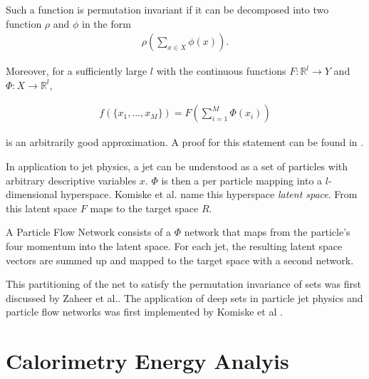 \documentclass[12pt, a4paper]{thesis}
\begin{document}
Such a function is permutation invariant if it can be decomposed into
two function $\rho$ and $\phi$ in the form
\begin{align}
\rho \left(\sum_{x\in X} \phi(x)\right).  
\end{align}

Moreover, for a sufficiently large \(l\) with the continuous functions
\(F: \mathbb{R}^l \rightarrow Y\) and \(\Phi: X \rightarrow
\mathbb{R}^l\),

\begin{align}
f(\{x_1, ... , x_M \}) = F(\sum_{i=1}^M \Phi(x_i))
\end{align}

is an arbitrarily good approximation. A proof for this statement can be
found in \cite{zaheer17_deep_sets}.

In application to jet physics, a jet can be understood as a set of
particles with arbitrary descriptive variables \(x\). \(\Phi\) is then
a per particle mapping into a \(l\)-dimensional hyperspace.  Komiske
et al. name this hyperspace \emph{latent space}. From this latent
space \(F\) maps to the target space \(R\).

A Particle Flow Network \cite{komiske19_energ_flow_networ} consists of
a \(\Phi\) network that maps from the particle's four momentum into
the latent space. For each jet, the resulting latent space vectors are
summed up and mapped to the target space with a second network.

This partitioning of the net to satisfy the permutation invariance of
sets was first discussed by Zaheer et
al.\cite{zaheer17_deep_sets}. The application of deep sets in particle
jet physics and particle flow networks was first implemented by
Komiske et al \cite{komiske19_energ_flow_networ}.

\chapter{Calorimetry Energy Analyis}
\label{sec:orgb9c4fb7}
\end{document}
